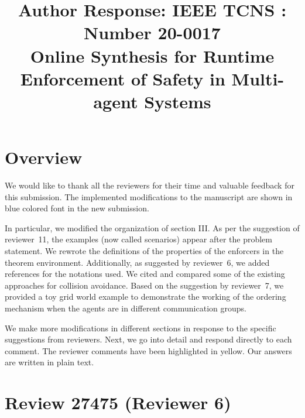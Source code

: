\documentclass{article}[12pt]
\title{Author Response: IEEE TCNS : Number 20-0017 \\
\small{Online Synthesis for Runtime Enforcement of Safety in Multi-agent Systems}}
\date{}
\begin{document}
\maketitle

\section{Overview}

We would like to thank all the reviewers for their time and valuable feedback for this submission. The implemented modifications to the manuscript are shown in blue colored font in the new submission. 

In particular, we modified the organization of section III. As per the suggestion of reviewer~11, the examples (now called scenarios) appear after the problem statement. We rewrote the definitions of the properties of the enforcers in the theorem environment. Additionally, as suggested by reviewer~6, we added references for the notations used. We cited and compared some of the existing approaches for collision avoidance. Based on the suggestion by reviewer~7, we provided a toy grid world example to demonstrate the working of the ordering mechanism when the agents are in different communication groups.

We make more modifications in different sections in response to the specific suggestions from reviewers. Next, we go into detail and respond directly to each comment. The reviewer comments have been highlighted in yellow. Our answers are written in plain text.

\section{Review 27475 (Reviewer 6)}
\end{document}
